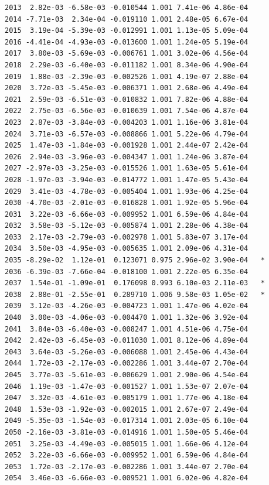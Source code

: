 \documentclass[
  letterpaper,
  DIV=11,
  numbers=noendperiod]{scrartcl}
\begin{document}
\begin{verbatim}
2013  2.82e-03 -6.58e-03 -0.010544 1.001 7.41e-06 4.86e-04    
2014 -7.71e-03  2.34e-04 -0.019110 1.001 2.48e-05 6.67e-04    
2015  3.19e-04 -5.39e-03 -0.012991 1.001 1.13e-05 5.09e-04    
2016 -4.41e-04 -4.93e-03 -0.013600 1.001 1.24e-05 5.19e-04    
2017  3.80e-03 -5.69e-03 -0.006761 1.001 3.02e-06 4.56e-04    
2018  2.29e-03 -6.40e-03 -0.011182 1.001 8.34e-06 4.90e-04    
2019  1.88e-03 -2.39e-03 -0.002526 1.001 4.19e-07 2.88e-04    
2020  3.72e-03 -5.45e-03 -0.006371 1.001 2.68e-06 4.49e-04    
2021  2.59e-03 -6.51e-03 -0.010832 1.001 7.82e-06 4.88e-04    
2022  2.75e-03 -6.56e-03 -0.010639 1.001 7.54e-06 4.87e-04    
2023  2.87e-03 -3.84e-03 -0.004203 1.001 1.16e-06 3.81e-04    
2024  3.71e-03 -6.57e-03 -0.008866 1.001 5.22e-06 4.79e-04    
2025  1.47e-03 -1.84e-03 -0.001928 1.001 2.44e-07 2.42e-04    
2026  2.94e-03 -3.96e-03 -0.004347 1.001 1.24e-06 3.87e-04    
2027 -2.97e-03 -3.25e-03 -0.015526 1.001 1.63e-05 5.61e-04    
2028 -1.97e-03 -3.94e-03 -0.014772 1.001 1.47e-05 5.43e-04    
2029  3.41e-03 -4.78e-03 -0.005404 1.001 1.93e-06 4.25e-04    
2030 -4.70e-03 -2.01e-03 -0.016828 1.001 1.92e-05 5.96e-04    
2031  3.22e-03 -6.66e-03 -0.009952 1.001 6.59e-06 4.84e-04    
2032  3.58e-03 -5.12e-03 -0.005874 1.001 2.28e-06 4.38e-04    
2033  2.17e-03 -2.79e-03 -0.002978 1.001 5.83e-07 3.17e-04    
2034  3.50e-03 -4.95e-03 -0.005635 1.001 2.09e-06 4.31e-04    
2035 -8.29e-02  1.12e-01  0.123071 0.975 2.96e-02 3.90e-04   *
2036 -6.39e-03 -7.66e-04 -0.018100 1.001 2.22e-05 6.35e-04    
2037  1.54e-01 -1.09e-01  0.176098 0.993 6.10e-03 2.11e-03   *
2038  2.88e-01 -2.55e-01  0.289710 1.006 9.58e-03 1.05e-02   *
2039  3.12e-03 -4.26e-03 -0.004723 1.001 1.47e-06 4.02e-04    
2040  3.00e-03 -4.06e-03 -0.004470 1.001 1.32e-06 3.92e-04    
2041  3.84e-03 -6.40e-03 -0.008247 1.001 4.51e-06 4.75e-04    
2042  2.42e-03 -6.45e-03 -0.011030 1.001 8.12e-06 4.89e-04    
2043  3.64e-03 -5.26e-03 -0.006088 1.001 2.45e-06 4.43e-04    
2044  1.72e-03 -2.17e-03 -0.002286 1.001 3.44e-07 2.70e-04    
2045  3.77e-03 -5.61e-03 -0.006629 1.001 2.90e-06 4.54e-04    
2046  1.19e-03 -1.47e-03 -0.001527 1.001 1.53e-07 2.07e-04    
2047  3.32e-03 -4.61e-03 -0.005179 1.001 1.77e-06 4.18e-04    
2048  1.53e-03 -1.92e-03 -0.002015 1.001 2.67e-07 2.49e-04    
2049 -5.35e-03 -1.54e-03 -0.017314 1.001 2.03e-05 6.10e-04    
2050 -2.16e-03 -3.81e-03 -0.014916 1.001 1.50e-05 5.46e-04    
2051  3.25e-03 -4.49e-03 -0.005015 1.001 1.66e-06 4.12e-04    
2052  3.22e-03 -6.66e-03 -0.009952 1.001 6.59e-06 4.84e-04    
2053  1.72e-03 -2.17e-03 -0.002286 1.001 3.44e-07 2.70e-04    
2054  3.46e-03 -6.66e-03 -0.009521 1.001 6.02e-06 4.82e-04    

\end{verbatim}
\end{document}
